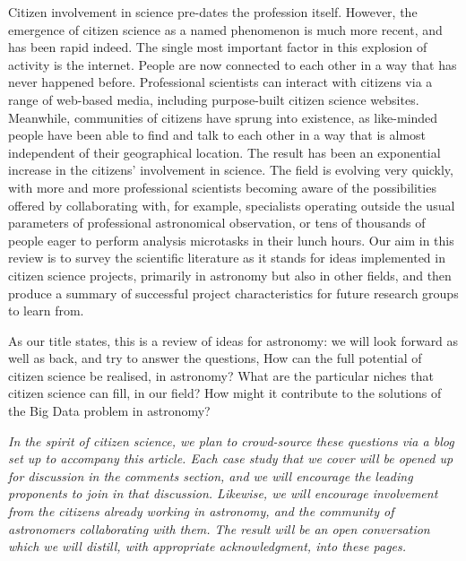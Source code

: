 \documentclass{ar2e}
\begin{document}
Citizen involvement in science pre-dates the profession itself. However, the
emergence of citizen science as a named phenomenon is much more recent, and has
been rapid indeed. The single most important factor in this explosion of
activity is the internet. People are now connected to each other in a way that
has never happened before. Professional scientists can interact with citizens
via a range of web-based media, including purpose-built citizen science
websites. Meanwhile, communities of citizens have sprung into existence, as
like-minded people have been able to find and talk to each other in a way that
is almost independent of their geographical location. The result has been an
exponential increase in the citizens' involvement in science. The field is
evolving very quickly, with more and more professional scientists becoming aware
of the possibilities offered by collaborating with, for example, specialists
operating outside the usual parameters of professional astronomical observation,
or tens of thousands of people eager to perform analysis microtasks in their
lunch hours.  Our aim in this review is to survey the scientific literature as
it stands for ideas implemented in citizen science projects, primarily in
astronomy but also in other fields, and then produce a summary of successful
project characteristics for future research groups to learn from.

As our title states, this is a review of ideas for astronomy: we will look
forward as well as back, and try to answer the questions, How can the full
potential of citizen science be realised, in astronomy? What are the particular
niches that citizen science can fill, in our field? How might it contribute to
the solutions of the Big Data problem in astronomy?

{\it In the spirit of citizen science, we plan to crowd-source these questions via a
blog set up to accompany this article.  Each case study that we cover will be
opened up for discussion in the comments section, and we will encourage the
leading proponents to join in that discussion. Likewise, we will encourage
involvement from the citizens already working in astronomy, and the 
community of astronomers collaborating with them. The result will be an open
conversation which we will distill, with appropriate acknowledgment, into these
pages.}
\end{document}
